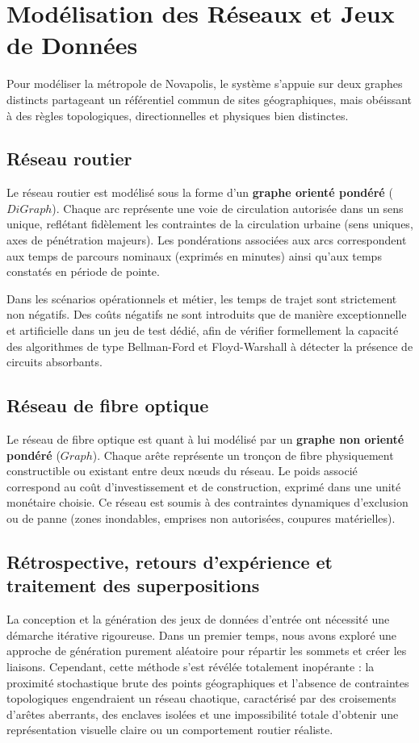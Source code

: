 \section{Modélisation des Réseaux et Jeux de Données}

Pour modéliser la métropole de Novapolis, le système s'appuie sur deux graphes distincts partageant un référentiel commun de sites géographiques, mais obéissant à des règles topologiques, directionnelles et physiques bien distinctes.

\subsection{Réseau routier}
Le réseau routier est modélisé sous la forme d'un \textbf{graphe orienté pondéré} ($DiGraph$). Chaque arc représente une voie de circulation autorisée dans un sens unique, reflétant fidèlement les contraintes de la circulation urbaine (sens uniques, axes de pénétration majeurs). Les pondérations associées aux arcs correspondent aux temps de parcours nominaux (exprimés en minutes) ainsi qu'aux temps constatés en période de pointe. 

Dans les scénarios opérationnels et métier, les temps de trajet sont strictement non négatifs. Des coûts négatifs ne sont introduits que de manière exceptionnelle et artificielle dans un jeu de test dédié, afin de vérifier formellement la capacité des algorithmes de type Bellman-Ford et Floyd-Warshall à détecter la présence de circuits absorbants.

\subsection{Réseau de fibre optique}
Le réseau de fibre optique est quant à lui modélisé par un \textbf{graphe non orienté pondéré} ($Graph$). Chaque arête représente un tronçon de fibre physiquement constructible ou existant entre deux nœuds du réseau. Le poids associé correspond au coût d'investissement et de construction, exprimé dans une unité monétaire choisie. Ce réseau est soumis à des contraintes dynamiques d'exclusion ou de panne (zones inondables, emprises non autorisées, coupures matérielles).

\subsection{Rétrospective, retours d'expérience et traitement des superpositions}
La conception et la génération des jeux de données d'entrée ont nécessité une démarche itérative rigoureuse. Dans un premier temps, nous avons exploré une approche de génération purement aléatoire pour répartir les sommets et créer les liaisons. Cependant, cette méthode s'est révélée totalement inopérante : la proximité stochastique brute des points géographiques et l'absence de contraintes topologiques engendraient un réseau chaotique, caractérisé par des croisements d'arêtes aberrants, des enclaves isolées et une impossibilité totale d'obtenir une représentation visuelle claire ou un comportement routier réaliste.

